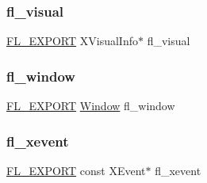 \mbox{\label{x_8_h_abe861b6ba1d71b2f73e3883c10ac5c27}} 
\subsubsection{\texorpdfstring{fl\+\_\+visual}{fl\_visual}}
{\footnotesize\ttfamily \hyperlink{_fl___export_8_h_aa9ba29a18aee9d738370a06eeb4470fc}{F\+L\+\_\+\+E\+X\+P\+O\+RT} X\+Visual\+Info$\ast$ fl\+\_\+visual}

\mbox{\label{x_8_h_afdab6664143864c36ba6b51782b32500}} 
\subsubsection{\texorpdfstring{fl\+\_\+window}{fl\_window}}
{\footnotesize\ttfamily \hyperlink{_fl___export_8_h_aa9ba29a18aee9d738370a06eeb4470fc}{F\+L\+\_\+\+E\+X\+P\+O\+RT} \hyperlink{mac_8_h_a213656d363e884b651cc92f58e863fc6}{Window} fl\+\_\+window}

\mbox{\label{x_8_h_a5c84596f8b5051b5c3125eb60bb51e0c}} 
\subsubsection{\texorpdfstring{fl\+\_\+xevent}{fl\_xevent}}
{\footnotesize\ttfamily \hyperlink{_fl___export_8_h_aa9ba29a18aee9d738370a06eeb4470fc}{F\+L\+\_\+\+E\+X\+P\+O\+RT} const X\+Event$\ast$ fl\+\_\+xevent}

